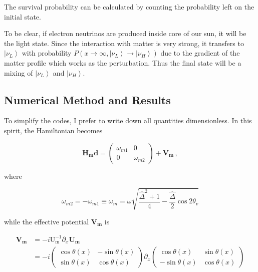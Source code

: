 \documentclass{tufte-handout}
\newcommand{\ket}[1]{\left| #1\right\rangle}
\begin{document}
The survival probability can be calculated by counting the probability left on the initial state.

To be clear, if electron neutrinos are produced inside core of our sun, it will be the light state. Since the interaction with matter is very strong, it transfers to $\ket{\nu_L}$ with probability $P(x\to \infty, \ket{\nu_L}\to\ket{\nu_H}) $ due to the gradient of the matter profile which works as the perturbation. Thus the final state will be a mixing of $\ket{\nu_L}$ and $\ket{\nu_H}$.











\subsection{Numerical Method and Results}





To simplify the codes, I prefer to write down all quantities dimensionless. In this spirit, the Hamiltonian becomes

\begin{equation*}
\mathbf{H_md} = \begin{pmatrix}
\omega_{m1} & 0 \\
0 & \omega_{m2}
\end{pmatrix} + \mathbf{V_m} \, ,
\end{equation*}

where 

\begin{equation*}
\omega_{m2} = - \omega_{m1} \equiv \omega_m = \omega \sqrt{\frac{\hat\Delta ^2 + 1}{4} - \frac{\hat\Delta}{2}\cos 2\theta_v }
\end{equation*}

while the effective potential $\mathbf{V_m}$ is

\begin{align*}
\mathbf{V_m} & = - i \mathrm{U_m^{-1}}\partial_x \mathbf{U_m} \\
& = - i \begin{pmatrix} \cos \theta(x) & -\sin\theta(x) \\ \sin\theta(x) & \cos\theta(x) \end{pmatrix} \partial_x \begin{pmatrix} \cos \theta(x) & \sin\theta(x) \\ -\sin\theta(x) & \cos\theta(x) \end{pmatrix} 
\end{align*}
\end{document}
